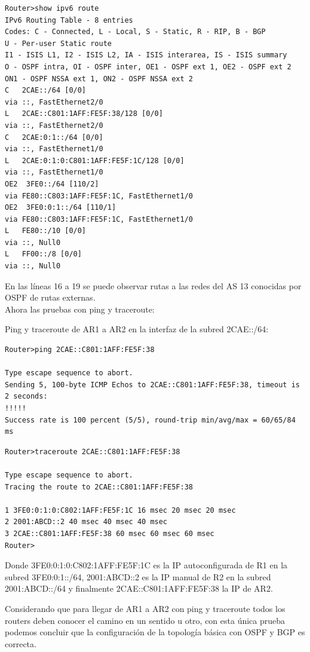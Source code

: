 \documentclass{article}
\begin{document}
\begin{lstlisting}
Router>show ipv6 route
IPv6 Routing Table - 8 entries
Codes: C - Connected, L - Local, S - Static, R - RIP, B - BGP
U - Per-user Static route
I1 - ISIS L1, I2 - ISIS L2, IA - ISIS interarea, IS - ISIS summary
O - OSPF intra, OI - OSPF inter, OE1 - OSPF ext 1, OE2 - OSPF ext 2
ON1 - OSPF NSSA ext 1, ON2 - OSPF NSSA ext 2
C   2CAE::/64 [0/0]
via ::, FastEthernet2/0
L   2CAE::C801:1AFF:FE5F:38/128 [0/0]
via ::, FastEthernet2/0
C   2CAE:0:1::/64 [0/0]
via ::, FastEthernet1/0
L   2CAE:0:1:0:C801:1AFF:FE5F:1C/128 [0/0]
via ::, FastEthernet1/0
OE2  3FE0::/64 [110/2]
via FE80::C803:1AFF:FE5F:1C, FastEthernet1/0
OE2  3FE0:0:1::/64 [110/1]
via FE80::C803:1AFF:FE5F:1C, FastEthernet1/0
L   FE80::/10 [0/0]
via ::, Null0
L   FF00::/8 [0/0]
via ::, Null0
\end{lstlisting}                                                                                

En las líneas 16 a 19 se puede observar rutas a las redes del AS 13 conocidas por OSPF de rutas externas.
\\

Ahora las pruebas con ping y traceroute:

Ping y traceroute de AR1 a AR2 en la interfaz de la subred 2CAE::/64:
\begin{lstlisting}
Router>ping 2CAE::C801:1AFF:FE5F:38

Type escape sequence to abort.
Sending 5, 100-byte ICMP Echos to 2CAE::C801:1AFF:FE5F:38, timeout is 2 seconds:
!!!!!
Success rate is 100 percent (5/5), round-trip min/avg/max = 60/65/84 ms
\end{lstlisting}
\begin{lstlisting}
Router>traceroute 2CAE::C801:1AFF:FE5F:38

Type escape sequence to abort.
Tracing the route to 2CAE::C801:1AFF:FE5F:38

1 3FE0:0:1:0:C802:1AFF:FE5F:1C 16 msec 20 msec 20 msec
2 2001:ABCD::2 40 msec 40 msec 40 msec
3 2CAE::C801:1AFF:FE5F:38 60 msec 60 msec 60 msec
Router>
\end{lstlisting}
                                                       
Donde 3FE0:0:1:0:C802:1AFF:FE5F:1C es la IP autoconfigurada de R1 en la subred 3FE0:0:1::/64, 2001:ABCD::2 es la IP manual de R2 en la subred 2001:ABCD::/64 y finalmente 2CAE::C801:1AFF:FE5F:38 la IP de AR2.

Considerando que para llegar de AR1 a AR2 con ping y traceroute todos los routers deben conocer el camino en un sentido u otro, con esta única prueba podemos concluir que la configuración de la topología básica con OSPF y BGP es correcta.
\end{document}
